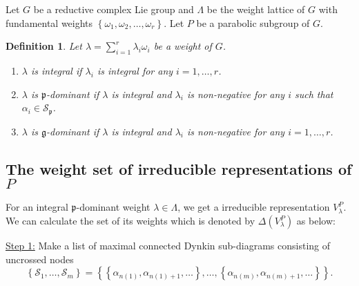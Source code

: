 \documentclass[uplatex,dvipdfmx]{jsarticle}
\newtheorem{definition}{Definition}[section]
\begin{document}
Let
$G$
be a reductive complex Lie group and
$\Lambda$
be the weight lattice of
$G$
with fundamental weights
$\left\{ \omega_1, \omega_2, \ldots, \omega_r \right\}$.
Let
$P$
be a parabolic subgroup of
$G$.

\begin{definition}
    Let 
    $\lambda = \sum_{i = 1}^r \lambda_i \omega_i$ 
    be a weight of
    $G$.
    \begin{enumerate}
        \item
            $\lambda$
            is
            \textit{integral} 
            if
            $\lambda_i$
            is integral for any
            $i = 1, \ldots, r$.
        \item 
            $\lambda$
            is
            $\mathfrak{p}$\textit{-dominant} 
            if
            $\lambda$
            is integral and
            $\lambda_i$
            is non-negative for any
            $i$
            such that
            $\alpha_i \in \mathcal{S}_\mathfrak{p}$.
        \item 
            $\lambda$
            is
            $\mathfrak{g}$\textit{-dominant} 
            if
            $\lambda$
            is integral and
            $\lambda_i$
            is non-negative for any
            $i = 1, \ldots, r$.
    \end{enumerate}
\end{definition}

\subsection{The weight set of irreducible representations of $P$}

For an integral
$\mathfrak{p}$-dominant
weight
$\lambda \in \Lambda$,
we get a irreducible representation
$V_\lambda^P$.
We can calculate the set of its weights which is denoted by
$\Delta(V_\lambda^P)$ as below:

\underline{Step 1:}
Make a list of maximal connected Dynkin sub-diagrams consisting of uncrossed nodes
\begin{equation}
    \left\{ 
        \mathcal{S}_1, 
        \ldots, 
        \mathcal{S}_m 
    \right\}
    =
    \left\{
        \left\{ \alpha_{n(1)}, \alpha_{n(1)+1}, \ldots \right\},
        \ldots, 
        \left\{ \alpha_{n(m)}, \alpha_{n(m)+1}, \ldots \right\} 
    \right\}.
\end{equation}
\end{document}
